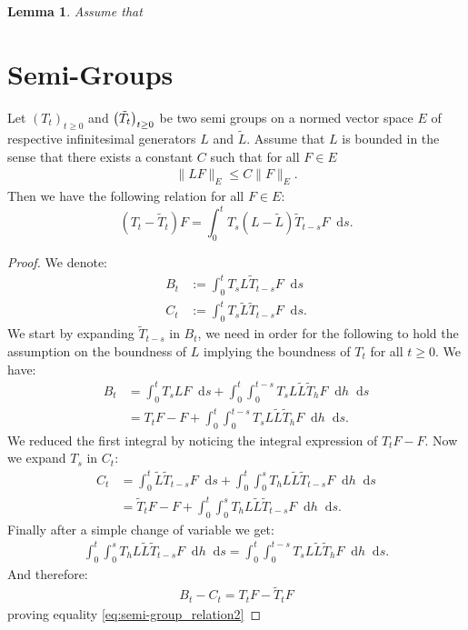 \documentclass[11pt,a4paper]{article}
\newcommand{\Proc}[1]{\left(#1\right)_{t\geq 0}}
\newcommand{\dd}{\mathop{}\!\mathrm{d}}
\newtheorem{lemma}[theorem]{Lemma}
\begin{document}
\begin{lemma}
    Assume that 
\end{lemma}
\appendix
\section{Semi-Groups}\label{section:semi_groups}

Let $\Proc{T_t}$ and $\Proc{\Tilde{T}_t}$ be two semi groups on a normed vector space $E$ of respective infinitesimal generators $L$ and $\tilde{L}$. Assume that $L$ is bounded in the sense that there exists a constant $C$ such that for all $F \in E$ 
\begin{align*}
    \| L F\|_E \leq C \|F\|_E.
\end{align*}
Then we have the following relation for all $F \in E$:
\begin{equation}\label{eq:semi-group_relation2}
    \left(T_t - \tilde{T}_t\right)F = \int_0^t T_s \left( L - \tilde{L} \right) \tilde{T}_{t-s}F \dd s.
\end{equation}
\begin{proof}
    We denote:
    \begin{align*}
        B_t &:= \int_0^t T_s L \tilde{T}_{t-s}F \dd s\\
        C_t &:= \int_0^t T_s \tilde{L} \tilde{T}_{t-s}F \dd s.
    \end{align*}
    We start by expanding $\tilde{T}_{t-s}$ in $B_t$, we need in order for the following to hold the assumption on the boundness of $L$ implying the boundness of $T_t$ for all $t\geq 0$. We have:
    \begin{align*}
        B_t &= \int_0^t T_s LF \dd s + \int_0^t\int_0^{t-s} T_s L \tilde{L} \tilde{T}_h F \dd h \dd s\\
        &= T_tF - F +  \int_0^t\int_0^{t-s} T_s L \tilde{L} \tilde{T}_h F \dd h \dd s.
     \end{align*}
     We reduced the first integral by noticing the integral expression of $T_tF - F$. Now we expand $T_s$ in $C_t$:
     \begin{align*}
        C_t &= \int_0^t \tilde{L} \tilde{T}_{t-s}F \dd s +
        \int_0^t \int_0^s T_h L\tilde{L} \tilde{T}_{t-s}F \dd h \dd s\\
        &= \tilde{T}_t F - F + \int_0^t \int_0^s T_h L\tilde{L} \tilde{T}_{t-s}F \dd h \dd s.
     \end{align*}
     Finally after a simple change of variable we get:
     \begin{align*}
         \int_0^t \int_0^s T_h L\tilde{L} \tilde{T}_{t-s}F \dd h \dd s = \int_0^t\int_0^{t-s} T_s L \tilde{L} \tilde{T}_h F \dd h \dd s.
     \end{align*}
     And therefore:
     \begin{align*}
         B_t - C_t = T_t F - \tilde{T}_t F
     \end{align*}
     proving equality \eqref{eq:semi-group_relation2}
\end{proof}
\end{document}
